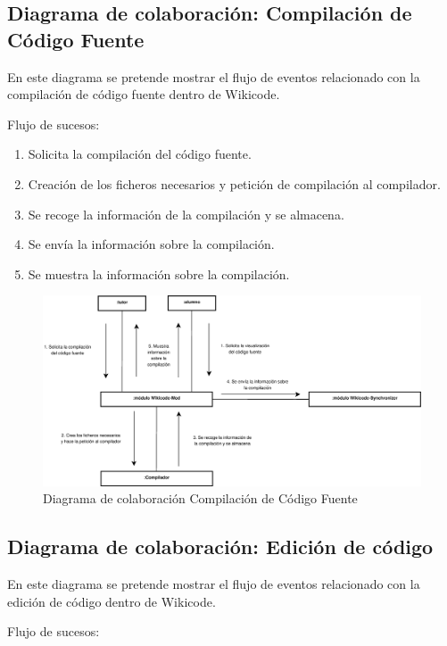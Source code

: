 \newpage

\subsection{Diagrama de colaboración: Compilación de Código Fuente}

En este diagrama se pretende mostrar el flujo de eventos relacionado con la compilación de código fuente dentro de Wikicode.

Flujo de sucesos:

\begin{enumerate}
	\item Solicita la compilación del código fuente.
	\item Creación de los ficheros necesarios y petición de compilación al compilador.
	\item Se recoge la información de la compilación y se almacena.
	\item Se envía la información sobre la compilación.
	\item Se muestra la información sobre la compilación.
\end{enumerate}

\begin{figure}[h]
	\centering
	\includegraphics[width=\textwidth]{./img/c3-dia-col3.eps}
	\caption{Diagrama de colaboración Compilación de Código Fuente}
\end{figure}

\subsection{Diagrama de colaboración: Edición de código}

En este diagrama se pretende mostrar el flujo de eventos relacionado con la edición de código dentro de Wikicode.

Flujo de sucesos:

